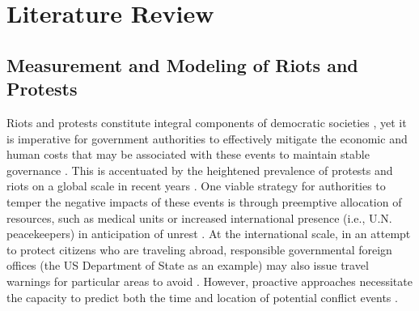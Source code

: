 
\chapter{Literature Review} %


\label{Chapter2} %

\section{Measurement and Modeling of Riots and Protests}

Riots and protests constitute integral components of democratic societies \citep{anderson2006learning}, yet it is imperative for government authorities to effectively mitigate the economic and human costs that may be associated with these events to maintain stable governance \citep{klein2018dynamics}.  This is accentuated by the heightened prevalence of protests and riots on a global scale in recent years \citep{ciorciari2016nationalist}.  One viable strategy for authorities to temper the negative impacts of these events is through preemptive allocation of resources, such as medical units \citep{gong2007allocation} or increased international presence (i.e., U.N. peacekeepers) in anticipation of unrest \citep{greer2010we}.  At the international scale, in an attempt to protect citizens who are traveling abroad, responsible governmental foreign offices (the US Department of State as an example) may also issue travel warnings for particular areas to avoid \citep{lowenheim2007responsibility}.  However, proactive approaches necessitate the capacity to predict both the time and location of potential conflict events \citep{wu2017forecasting}.

